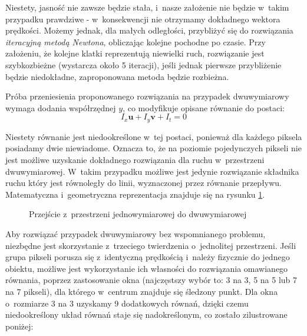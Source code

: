     Niestety, jasność nie zawsze będzie stała, i~nasze założenie nie będzie w~takim przypadku prawdziwe - w~konsekwencji nie otrzymamy dokładnego wektora prędkości. Możemy jednak, dla małych odległości, przybliżyć się do rozwiązania \textit{iteracyjną metodą Newtona}, obliczając kolejne pochodne po czasie. Przy założeniu, że kolejne klatki reprezentują niewielki ruch, rozwiązanie jest szybkozbieżne (wystarcza około 5 iteracji), jeśli jednak pierwsze przybliżenie będzie niedokładne, zaproponowana metoda będzie rozbieżna.

    Próba przeniesienia proponowanego rozwiązania na przypadek dwuwymiarowy wymaga dodania współrzędnej $y$, co modyfikuje opisane równanie do postaci: \[I_{x}\mathbf{u} + I_{y}\mathbf{v} + I_{t} = 0\]

    Niestety równanie jest niedookreślone w~tej postaci, ponieważ dla każdego piksela posiadamy dwie niewiadome. Oznacza to, że na poziomie pojedynczych pikseli nie jest możliwe uzyskanie dokładnego rozwiązania dla ruchu w~przestrzeni dwuwymiarowej. W~takim przypadku możliwe jest jedynie rozwiązanie składnika ruchu który jest równoległy do linii, wyznaczonej przez równanie przepływu. Matematyczna i~geometryczna reprezentacja znajduje się na rysunku \ref{fig:From1dTo2d}.

    \begin{figure}[!ht]
      \centering
      \caption[Przejście z~przestrzeni jednowymiarowej do dwuwymiarowej]{Przejście z~przestrzeni jednowymiarowej do dwuwymiarowej}
      \label{fig:From1dTo2d}
    \end{figure}

    Aby rozwiązać przypadek dwuwymiarowy bez wspomnianego problemu, niezbędne jest skorzystanie z~trzeciego twierdzenia o~jednolitej przestrzeni. Jeśli grupa pikseli porusza się z~identyczną prędkością i~należy fizycznie do jednego obiektu, możliwe jest wykorzystanie ich własności do rozwiązania omawianego równania, poprzez zastosowanie okna (najczęstszy wybór to: 3 na 3, 5 na 5 lub 7 na 7 pikseli), dla którego w~centrum znajduje się śledzony punkt. Dla okna o~rozmiarze 3 na 3 uzyskamy 9 dodatkowych równań, dzięki czemu niedookreślony układ równań staje się nadokreślonym, co zostało zilustrowane poniżej:

